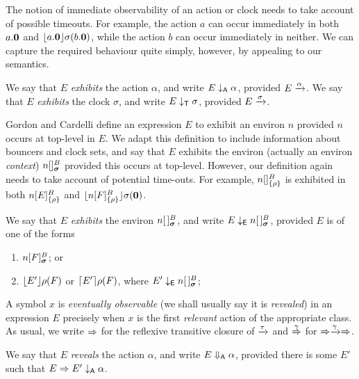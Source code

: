\documentclass[orivec,envcountsame]{llncs}
\begin{document}
The notion of immediate observability of an action or clock needs to take
account of possible timeouts. For example, the action $a$ can occur immediately
in both $a.\textbf{0}$ and $\lfloor{a.\textbf{0}}\rfloor {\sigma} ({b.\textbf{0}})$, while the
action $b$ can occur immediately in neither. We can capture the required
behaviour quite simply, however, by appealing to our semantics.

\begin{definition}
We say that $E$ \emph{exhibits} the action $\alpha$, and write $E
\mathrel{\downarrow_{\textsf{A}}} \alpha$, provided $E \xrightarrow{\alpha}$. We say that $E$
\emph{exhibits} the clock $\sigma$, and write $E \mathrel{\downarrow_{\textsf{T}}} \sigma$,
provided $E \xrightarrow{\sigma}$.
\end{definition}

Gordon and Cardelli \cite{GC99} define an expression $E$ to exhibit an
environ $n$ provided $n$ occurs at top-level in $E$. We adapt this
definition to include information about bouncers and clock sets, and say that
$E$ exhibits the environ (actually an environ \emph{context})
$\locv{n}{}{B}{\vec{\sigma}}$ provided this occurs at top-level. However, our
definition again needs to take account of potential time-outs. For example,
${n}[  ]^{B}_{\{\rho\}}$ is exhibited in both ${n}[ E ]^{B}_{\{\rho\}}$ and
$\lfloor{{n}[ F ]^{B}_{\{\rho\}}}\rfloor {\sigma} ({\textbf{0}})$.

\begin{definition}
We say that $E$ \emph{exhibits} the environ $\locv{n}{\,}{B}{\vec{\sigma}}$,
and write $E \ExhibitsE \locv{n}{\,}{B}{\vec{\sigma}}$, provided $E$ is 
of one of the forms

\begin{enumerate}
\item
    $\locv{n}{F}{B}{\vec{\sigma}}$; or
\item
    $\lfloor{E' }\rfloor {\rho} ({F})$ or $\lceil{E' }\rceil {\rho} ({F})$,
    where $E' \ExhibitsE \locv{n}{\,}{B}{\vec{\sigma}}$;
\end{enumerate}
\end{definition}


A symbol $x$ is \emph{eventually observable} (we shall usually say it
is \emph{revealed}) in an expression $E$ precisely when $x$ is the
first \emph{relevant} action of the appropriate class. As usual, we
write $\mathrel{\Rightarrow}$ for the reflexive transitive closure of $\xrightarrow{\tau}$ and 
$\stackrel{\gamma}{\Rightarrow}$ for $\mathrel{\Rightarrow}\xrightarrow{\gamma}\mathrel{\Rightarrow}$.

\begin{definition}
We say that $E$ \emph{reveals} the action $\alpha$, and write $E
\mathrel{\Downarrow_{\textsf{A}}} \alpha$, provided there is some $E'$ such that $E
\mathrel{\Rightarrow} E' \mathrel{\downarrow_{\textsf{A}}} \alpha$.
\end{definition}
\end{document}
